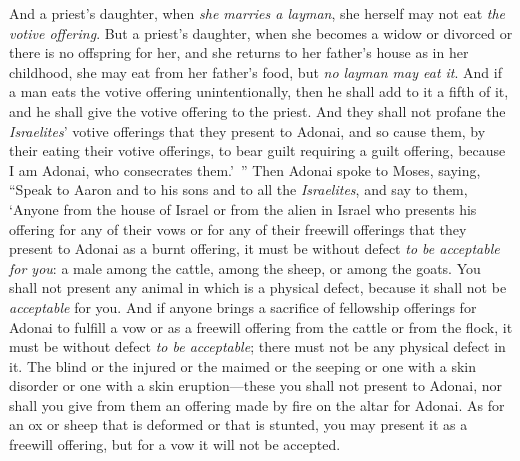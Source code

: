 \begin{biblechapter}
\verse And a priest’s daughter, when \textit{she marries a layman}, she herself may not eat \textit{the votive offering}.
\verse But a priest’s daughter, when she becomes a widow or divorced or there is no offspring for her, and she returns to her father’s house as in her childhood, she may eat from her father’s food, but \textit{no layman may eat it}.
\verse And if a man eats the votive offering unintentionally, then he shall add to it a fifth of it, and he shall give the votive offering to the priest.
\verse And they shall not profane the \textit{Israelites}’ votive offerings that they present to Adonai,
\verse and so cause them, by their eating their votive offerings, to bear guilt requiring a guilt offering, because I am Adonai, who consecrates them.’ ”
 Then Adonai spoke to Moses, saying,
\verse “Speak to Aaron and to his sons and to all the \textit{Israelites}, and say to them, ‘Anyone from the house of Israel or from the alien in Israel who presents his offering for any of their vows or for any of their freewill offerings that they present to Adonai as a burnt offering,
\verse it must be without defect \textit{to be acceptable for you}: a male among the cattle, among the sheep, or among the goats.
\verse You shall not present any animal in which is a physical defect, because it shall not be \textit{acceptable} for you.
\verse And if anyone brings a sacrifice of fellowship offerings for Adonai to fulfill a vow or as a freewill offering from the cattle or from the flock, it must be without defect \textit{to be acceptable}; there must not be any physical defect in it.
\verse The blind or the injured or the maimed or the seeping or one with a skin disorder or one with a skin eruption—these you shall not present to Adonai, nor shall you give from them an offering made by fire on the altar for Adonai.
\verse As for an ox or sheep that is deformed or that is stunted, you may present it as a freewill offering, but for a vow it will not be accepted.

\end{biblechapter}
